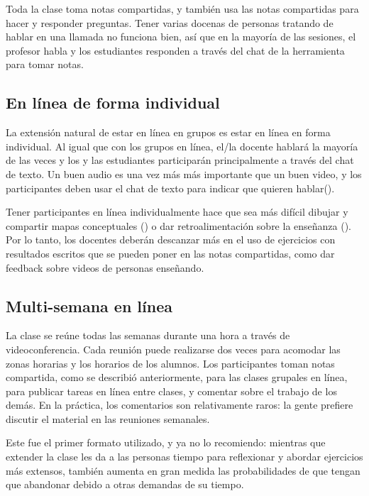 Toda la clase toma notas compartidas,
y también usa las notas compartidas para hacer y responder preguntas.
Tener varias docenas de personas tratando de hablar en una llamada no funciona bien,
así que en la mayoría de las sesiones,
el profesor habla y los estudiantes responden a través del chat de la herramienta para tomar notas.

\subsection*{En línea de forma individual}

La extensión natural de estar en línea en grupos es estar en línea en forma individual.
Al igual que con los grupos en línea,
el/la docente hablará la mayoría de las veces y los y las estudiantes participarán principalmente a través del chat de texto.
Un buen audio es una vez más más importante que un buen video,
y los participantes deben usar el chat de texto para indicar que quieren hablar().

Tener participantes en línea individualmente hace que sea más difícil dibujar y compartir mapas conceptuales ()
o dar retroalimentación sobre la enseñanza ().
Por lo tanto, los docentes deberán descanzar más en el uso de ejercicios con resultados escritos que se pueden poner en las notas compartidas,
como dar feedback sobre videos de personas enseñando.

\subsection*{Multi-semana en línea}

La clase se reúne todas las semanas durante una hora a través de videoconferencia.
Cada reunión puede realizarse dos veces para acomodar las zonas horarias y los horarios de los alumnos.
Los participantes toman notas compartida, como se describió anteriormente, para las clases grupales en línea,
para publicar tareas en línea entre clases,
y comentar sobre el trabajo de los demás.
En la práctica,
los comentarios son relativamente raros:
la gente prefiere discutir el material en las reuniones semanales.

Este fue el primer formato utilizado,
y ya no lo recomiendo:
mientras que extender la clase les da a las personas tiempo para reflexionar y abordar ejercicios más extensos,
también aumenta en gran medida las probabilidades de que tengan que abandonar debido a otras demandas de su tiempo.

